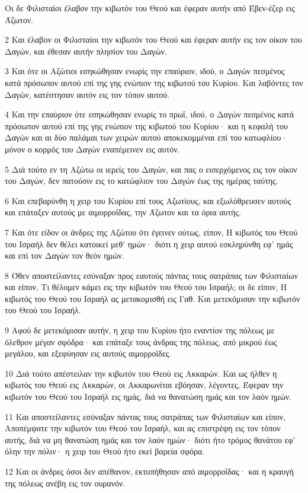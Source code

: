 \par Οι δε Φιλισταίοι έλαβον την κιβωτόν του Θεού και έφεραν αυτήν από Έβεν-έζερ εις Άζωτον.
\par 2 Και έλαβον οι Φιλισταίοι την κιβωτόν του Θεού και έφεραν αυτήν εις τον οίκον του Δαγών, και έθεσαν αυτήν πλησίον του Δαγών.
\par 3 Και ότε οι Αζώτιοι εσηκώθησαν ενωρίς την επαύριον, ιδού, ο Δαγών πεσμένος κατά πρόσωπον αυτού επί της γης ενώπιον της κιβωτού του Κυρίου. Και λαβόντες τον Δαγών, κατέστησαν αυτόν εις τον τόπον αυτού.
\par 4 Και την επαύριον ότε εσηκώθησαν ενωρίς το πρωΐ, ιδού, ο Δαγών πεσμένος κατά πρόσωπον αυτού επί της γης ενώπιον της κιβωτού του Κυρίου· και η κεφαλή του Δαγών και αι δύο παλάμαι των χειρών αυτού αποκεκομμέναι επί του κατωφλίου· μόνον ο κορμός του Δαγών εναπέμεινεν εις αυτόν.
\par 5 Διά τούτο εν τη Αζώτω οι ιερείς του Δαγών, και πας ο εισερχόμενος εις τον οίκον του Δαγών, δεν πατούσιν εις το κατώφλιον του Δαγών έως της ημέρας ταύτης.
\par 6 Και επεβαρύνθη η χειρ του Κυρίου επί τους Αζωτίους, και εξωλόθρευσεν αυτούς και επάταξεν αυτούς με αιμορροΐδας, την Άζωτον και τα όρια αυτής.
\par 7 Και ότε είδον οι άνδρες της Αζώτου ότι έγεινεν ούτως, είπον, Η κιβωτός του Θεού του Ισραήλ δεν θέλει κατοικεί μεθ' ημών· διότι η χειρ αυτού εσκληρύνθη εφ' ημάς και επί τον Δαγών τον θεόν ημών.
\par 8 Όθεν αποστείλαντες εσύναξαν προς εαυτούς πάντας τους σατράπας των Φιλισταίων και είπον, Τι θέλομεν κάμει εις την κιβωτόν του Θεού του Ισραήλ; οι δε είπον, Η κιβωτός του Θεού του Ισραήλ ας μετακομισθή εις Γαθ. Και μετεκόμισαν την κιβωτόν του Θεού του Ισραήλ.
\par 9 Αφού δε μετεκόμισαν αυτήν, η χειρ του Κυρίου ήτο εναντίον της πόλεως με όλεθρον μέγαν σφόδρα· και επάταξε τους άνδρας της πόλεως, από μικρού έως μεγάλου, και εξεφύησαν εις αυτούς αιμορροΐδες.
\par 10 Διά τούτο απέστειλαν την κιβωτόν του Θεού εις Ακκαρών. Και ως ήλθεν η κιβωτός του Θεού εις Ακκαρών, οι Ακκαρωνίται εβόησαν, λέγοντες, Έφεραν την κιβωτόν του Θεού του Ισραήλ εις ημάς, διά να θανατώση ημάς και τον λαόν ημών.
\par 11 Και αποστείλαντες εσύναξαν πάντας τους σατράπας των Φιλισταίων και είπον, Αποπέμψατε την κιβωτόν του Θεού του Ισραήλ, και ας επιστρέψη εις τον τόπον αυτής, διά να μη θανατώση ημάς και τον λαόν ημών· διότι ήτο τρόμος θανάτου εφ' όλην την πόλιν· η χειρ του Θεού ήτο εκεί βαρεία σφόρα.
\par 12 Και οι άνδρες όσοι δεν απέθανον, εκτυπήθησαν από αιμορροΐδας· και η κραυγή της πόλεως ανέβη εις τον ουρανόν.

